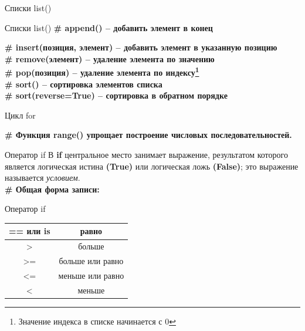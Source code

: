 \documentclass[12pt]{beamer}
\begin{document}
\begin{frame}{Списки list()}

\end{frame}


\begin{frame}{Списки list()}
\textbf{\# append() -- добавить элемент в конец} 

\vspace{0.5cm}
\textbf{\# insert(позиция, элемент) -- добавить элемент в указанную позицию} \\
\textbf{\# remove(элемент) -- удаление элемента по значению} \\
\textbf{\# pop(позиция) -- удаление элемента по индексу\footnote{Значение индекса в списке начинается с 0}} \\
\textbf{\# sort() -- сортировка элементов списка} \\
\textbf{\# sort(reverse=True) -- сортировка в обратном порядке} 
\end{frame}



\begin{frame}{Цикл for}

\vspace{0.3cm}
\textbf{\# Функция \textbf{range()} упрощает построение числовых последовательностей.}

\end{frame}

\begin{frame}{Оператор if}
В \textbf{if} центральное место занимает выражение, результатом которого является логическая истина \textbf{(True)} или логическая ложь \textbf{(False)}; это выражение называется \textit{условием}.\\
\vspace{0.5cm}
\textbf{\# Общая форма записи:}
\vspace{0.5cm}

\vspace{0.5cm}
\end{frame}


\begin{frame}{Оператор if}
\begin{tabular}{|c|c|}
\hline 
== или \textbf{is} & равно \\ 
\hline 
> & больше \\ 
\hline 
>= & больше или равно \\ 
\hline 
<= & меньше или равно \\ 
\hline 
< & меньше \\ 
\hline 
\end{tabular} 
\par
\vspace{0.5cm}

\end{frame}
\end{document}
